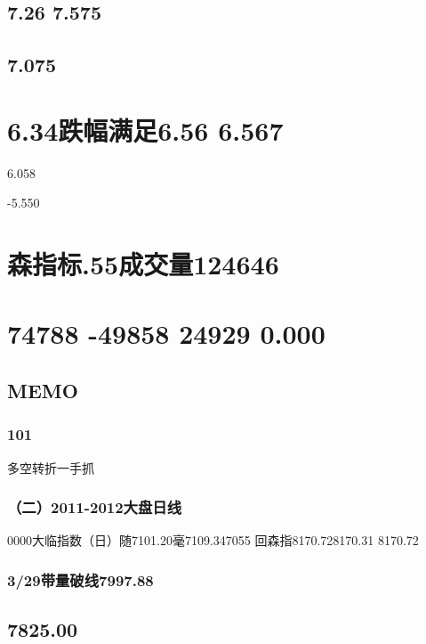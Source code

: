 \documentclass{article}
\begin{document}
\subsection{7.26 7.575}

\subsection{7.075}

\section{6.34跌幅满足6.56 6.567}

6.058

-5.550

\section{森指标.55成交量124646}

\section{74788 -49858 24929 0.000}

\subsection{MEMO}

\subsubsection{101}

\clearpage

多空转折一手抓

\subsubsection{（二）2011-2012大盘日线}

0000大临指数（日）随7101.20毫7109.347055 回森指8170.728170.31 8170.72

\subsubsection{3/29带量破线7997.88}

\subsection{7825.00}
\end{document}
